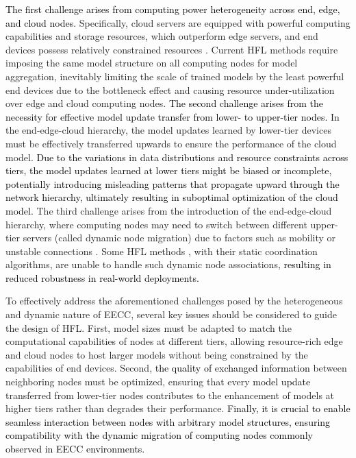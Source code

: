 \documentclass[10pt,journal]{IEEEtran}
\begin{document}
\textcolor{black}{The first challenge arises from computing power heterogeneity across end, edge, and cloud nodes.} 
Specifically, cloud servers are equipped with powerful computing capabilities and storage resources, which outperform edge servers, and end devices possess relatively constrained resources \cite{tak2020federated}. Current HFL methods \cite{liu2020client,wang2023accelerating,yang2023hierarchical,liu2022hierarchical} require imposing the same model structure on all computing nodes for model aggregation, inevitably limiting the scale of trained models by the least powerful end devices due to the bottleneck effect and causing resource under-utilization over edge and cloud computing nodes. 
\textcolor{black}{The second challenge arises from the necessity for effective model update transfer from lower- to upper-tier nodes.} In the end-edge-cloud hierarchy, the model updates learned by lower-tier devices must be effectively transferred upwards to ensure the performance of the cloud model. \textcolor{black}{Due to the variations in data distributions and resource constraints across tiers, the model updates learned at lower tiers might be biased or incomplete, potentially introducing misleading patterns that propagate upward through the network hierarchy, ultimately resulting in suboptimal optimization of the cloud model.} The third challenge arises from the introduction of the end-edge-cloud hierarchy, where computing nodes may need to switch between different upper-tier servers (called dynamic node migration) due to factors such as mobility or unstable connections \cite{wang2019dynamic,jsac-dynamic}. Some HFL methods \cite{deng2023hierarchical,wang2023accelerating}, with their static coordination algorithms, are unable to handle such dynamic node associations, \textcolor{black}{resulting in reduced robustness in real-world deployments.}


To effectively address the aforementioned challenges posed by the heterogeneous and dynamic nature of EECC, several key issues should be considered to guide the design of HFL. First, model sizes must be adapted to match the computational capabilities of nodes at different tiers, allowing resource-rich edge and cloud nodes to host larger models without being constrained by the capabilities of end devices. Second, \textcolor{black}{the quality of exchanged information} between neighboring nodes must be optimized, ensuring that every \textcolor{black}{model update} transferred from lower-tier nodes contributes to the enhancement of models at higher tiers rather than degrades their performance. \textcolor{black}{Finally, it is crucial to enable seamless interaction between nodes with arbitrary model structures, ensuring compatibility with the dynamic migration of computing nodes commonly observed in EECC environments.}
\end{document}
